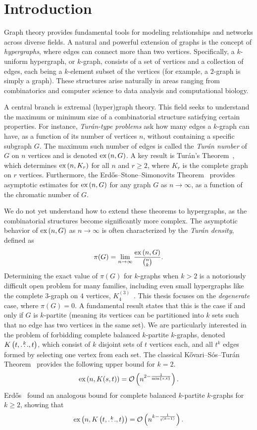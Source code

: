 \section{Introduction}\label{sec:introduction}

Graph theory provides fundamental tools for modeling relationships and networks across diverse fields.
A natural and powerful extension of graphs is the concept of \emph{hypergraphs},
where edges can connect more than two vertices.
Specifically, a $k$-uniform hypergraph, or $k$-graph,
consists of a set of vertices and a collection of edges, each being a $k$-element subset of the vertices
(for example, a $2$-graph is simply a graph).
These structures arise naturally in areas ranging from combinatorics and computer science to data analysis and
computational biology.

A central branch is extremal (hyper)graph theory.
This field seeks to understand the maximum or minimum size of a combinatorial structure satisfying certain properties.
For instance, \emph{Turán-type problems} ask how many edges a $k$-graph can have, as a function of its number of vertices $n$,
without containing a specific subgraph $G$.
The maximum such number of edges is called the \emph{Turán number} of $G$ on $n$ vertices and is denoted $\text{ex} \left( n, G \right)$.
A key result is Turán's Theorem~\cite{Turan1941},
which determines $\text{ex} \left( n, K_r \right)$ for all $n$ and $r \ge 2$, where $K_r$ is the complete graph on $r$ vertices.
Furthermore, the Erdős--Stone--Simonovits Theorem~\cite{erdos1946structure}
provides asymptotic estimates for $\text{ex} \left( n, G \right)$ for any graph $G$ as $n \to \infty$,
as a function of the chromatic number of $G$.

We do not yet understand how to extend these theorems to hypergraphs,
as the combinatorial structures become significantly more complex.
The asymptotic behavior of $\text{ex} \left( n, G \right)$ as $n \to \infty$
is often characterized by the \emph{Turán density}, defined as
\[
    \pi(G) = \lim_{n \to \infty} \frac{\text{ex} \left( n, G \right)}{\binom{n}{k}}.
\]
Determining the exact value of $\pi(G)$ for $k$-graphs when $k > 2$
is a notoriously difficult open problem for many families,
including even small hypergraphs like the complete $3$-graph on $4$ vertices,
$K_4^{(3)}$~\cite{keevash2011hypergraph, razborov20103}.
This thesis focuses on the \emph{degenerate} case, where $\pi(G) = 0$.
A fundamental result states that this is the case if and only if $G$ is $k$-partite
(meaning its vertices can be partitioned into $k$ sets such that no edge has two vertices in the same set).
We are particularly interested in the problem of forbidding complete balanced $k$-partite $k$-graphs,
denoted $K\left(t, \overset{k}{\dots}, t\right)$, which consist of $k$ disjoint sets of $t$ vertices each,
and all $t^k$ edges formed by selecting one vertex from each set.
The classical Kővari--Sós--Turán Theorem~\cite{Kovari1954, Hylten1958}
provides the following upper bound for $k=2$.
\[
    \text{ex} \left( n, K(s, t) \right) = \mathcal{O}\left(n^{2 - \frac{1}{\min\{s, t\}}}\right).
\]
Erdős~\cite{Erods1964} found an analogous bound for complete balanced $k$-partite $k$-graphs for $k \ge 2$,
showing that
\begin{equation} \label{eq:erdos64-intro}
    \text{ex} \left( n, K\left(t, \overset{k}{\dots}, t\right) \right) = \mathcal{O}\left(n^{k - \frac{1}{t^{(k-1)}}}\right).
\end{equation}


